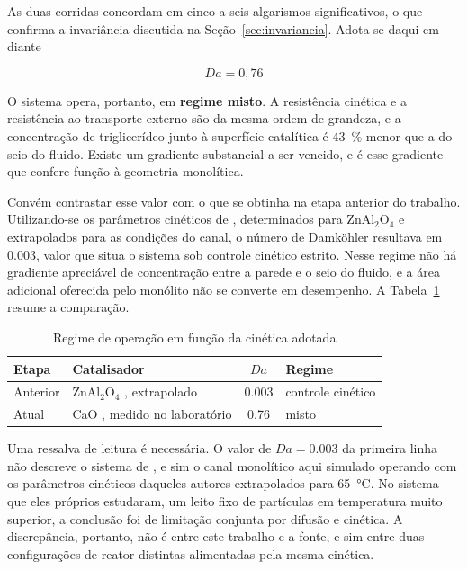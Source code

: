 As duas corridas concordam em cinco a seis algarismos significativos, o que
confirma a invariância discutida na Seção~\ref{sec:invariancia}. Adota-se
daqui em diante

\begin{equation}
\boxed{Da = 0{,}76}
\label{eq:daresultado}
\end{equation}

O sistema opera, portanto, em \textbf{regime misto}. A resistência cinética e a
resistência ao transporte externo são da mesma ordem de grandeza, e a
concentração de triglicerídeo junto à superfície catalítica é \SI{43}{\percent}
menor que a do seio do fluido. Existe um gradiente substancial a ser vencido, e
é esse gradiente que confere função à geometria monolítica.

Convém contrastar esse valor com o que se obtinha na etapa anterior do trabalho.
Utilizando-se os parâmetros cinéticos de \textcite{Allain2016}, determinados
para ZnAl$_2$O$_4$ e extrapolados para as condições do canal, o número de
Damköhler resultava em \num{0.003}, valor que situa o sistema sob controle
cinético estrito. Nesse regime não há gradiente apreciável de concentração entre
a parede e o seio do fluido, e a área adicional oferecida pelo monólito não se
converte em desempenho. A Tabela~\ref{tab:regimes} resume a comparação.

\begin{table}[htb]
\centering
\caption{Regime de operação em função da cinética adotada}
\label{tab:regimes}
\begin{tabular}{l l c l}
\toprule
Etapa & Catalisador & $Da$ & Regime \\
\midrule
Anterior & ZnAl$_2$O$_4$ \parencite{Allain2016}, extrapolado & \num{0.003} & controle cinético \\
Atual    & CaO \parencite{Melo2023}, medido no laboratório   & \num{0.76}  & misto \\
\bottomrule
\end{tabular}
\end{table}

Uma ressalva de leitura é necessária. O valor de $Da = \num{0.003}$ da primeira
linha não descreve o sistema de \textcite{Allain2016}, e sim o canal monolítico
aqui simulado operando com os parâmetros cinéticos daqueles autores
extrapolados para \SI{65}{\celsius}. No sistema que eles próprios estudaram,
um leito fixo de partículas em temperatura muito superior, a conclusão foi de
limitação conjunta por difusão e cinética. A discrepância, portanto, não é
entre este trabalho e a fonte, e sim entre duas configurações de reator
distintas alimentadas pela mesma cinética.

